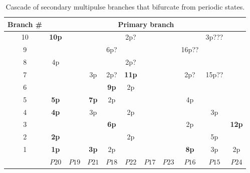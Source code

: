 \documentclass[api,pof,pre,12pt,a4paper]{revtex4-1}
\begin{document}
\begin{table}[ht]
\caption{Cascade of secondary multipulse branches that bifurcate from periodic states.} %
\centering %
\begin{tabular}{c | c c c c c c c c c c} %
\hline\hline %
 Branch \# &\multicolumn{10}{c}{ Primary branch}\\
\hline  %
10 	&\textbf{10p} &		&		&		&2p?		&		&		&		&3p???		&	\\
9	&      		&		&		&6p?	 	&		&		&		&16p??		&		&	\\
8	&4p  		&		&		&	 	&2p?		&		&		&		&		&	\\
7	&      		&		&3p		&2p?	 	&\textbf{11p}	&		&		&2p?		&15p??		&	\\
6	&      		&		&		&\textbf{9p} 	&2p		&		&		&		&		&	\\
5	&\textbf{5p}  	&		&\textbf{7p}	&2p	 	&		&		&		&4p		&		&	\\
4	&\textbf{4p} 	&		&3p		&	 	&2p		&		&		&		&3p		&	\\
3	&      		&		&		&\textbf{6p} 	&		&		&		&2p		&		&\textbf{12p}	\\
2	&\textbf{2p} 	&		&		&	 	&2p		&		&		&		&5p		&	\\
1	&\textbf{1p}  	&		&\textbf{3p}	&2p	 	&		&		&		&\textbf{8p}	&3p		&2p	\\
\hline %
 	&$P20$	&$P19$	&$P21$	&$P18$	&$P22$	&$P17$	&$P23$	&$P16$	&$P15$	&$P24$ \\ [1ex] %
\hline %
\end{tabular}
\label{table:multipulse} %
\end{table} 
\end{document}
